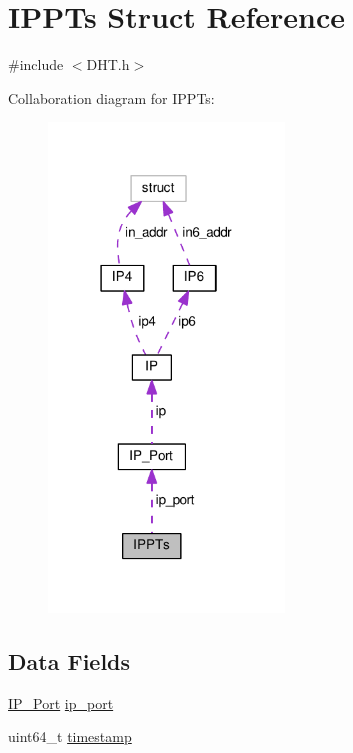 \hypertarget{struct_i_p_p_ts}{\section{I\+P\+P\+Ts Struct Reference}
\label{struct_i_p_p_ts}
}


{\ttfamily \#include $<$D\+H\+T.\+h$>$}



Collaboration diagram for I\+P\+P\+Ts\+:
\nopagebreak
\begin{figure}[H]
\begin{center}
\leavevmode
\includegraphics[width=178pt]{d9/d47/struct_i_p_p_ts__coll__graph}
\end{center}
\end{figure}
\subsection*{Data Fields}
\begin{DoxyCompactItemize}
\item 
\hyperlink{struct_i_p___port}{I\+P\+\_\+\+Port} \hyperlink{struct_i_p_p_ts_a86e2a5a56c0dd22df6e8b8a10e40f9e4}{ip\+\_\+port}
\item 
uint64\+\_\+t \hyperlink{struct_i_p_p_ts_a465bef81f6478756e5443025b1f2ddfa}{timestamp}
\end{DoxyCompactItemize}


